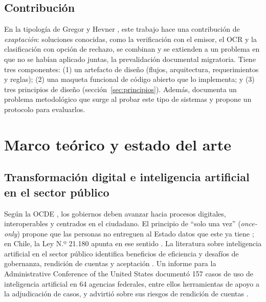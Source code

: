 \documentclass[11pt,a4paper]{article}
\begin{document}
\subsection{Contribución}
En la tipología de Gregor y Hevner \cite{gregor2013}, este trabajo hace una contribución de \emph{exaptación}: soluciones conocidas, como la verificación con el emisor, el OCR y la clasificación con opción de rechazo, se combinan y se extienden a un problema en que no se habían aplicado juntas, la prevalidación documental migratoria. Tiene tres componentes: (1) un artefacto de diseño (flujos, arquitectura, requerimientos y reglas); (2) una maqueta funcional de código abierto que lo implementa; y (3) tres principios de diseño (sección~\ref{sec:principios}). Además, documenta un problema metodológico que surge al probar este tipo de sistemas y propone un protocolo para evaluarlos.

\section{Marco teórico y estado del arte}
\label{sec:marco}

\subsection{Transformación digital e inteligencia artificial en el sector público}
Según la OCDE \cite{ocde2020}, los gobiernos deben avanzar hacia procesos digitales, interoperables y centrados en el ciudadano. El principio de ``solo una vez'' (\emph{once-only}) propone que las personas no entreguen al Estado datos que este ya tiene \cite{krimmer2017}; en Chile, la Ley N.º 21.180 apunta en ese sentido \cite{ley21180}. La literatura sobre inteligencia artificial en el sector público identifica beneficios de eficiencia y desafíos de gobernanza, rendición de cuentas y aceptación \cite{wirtz2019}. Un informe para la Administrative Conference of the United States documentó 157 casos de uso de inteligencia artificial en 64 agencias federales, entre ellos herramientas de apoyo a la adjudicación de casos, y advirtió sobre sus riesgos de rendición de cuentas \cite{engstrom2020}.
\end{document}

